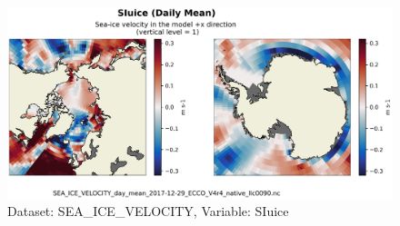\begin{figure}[H]
\centering
\includegraphics[scale=0.55]{../images/plots/v4r4/native_plots/Sea-Ice_Velocity/SIuice.png}
\caption{Dataset: SEA\_ICE\_VELOCITY, Variable: SIuice}
\label{tab:table-SEA_ICE_VELOCITY_SIuice-Plot}
\end{figure}
\newpage
\pagebreak
